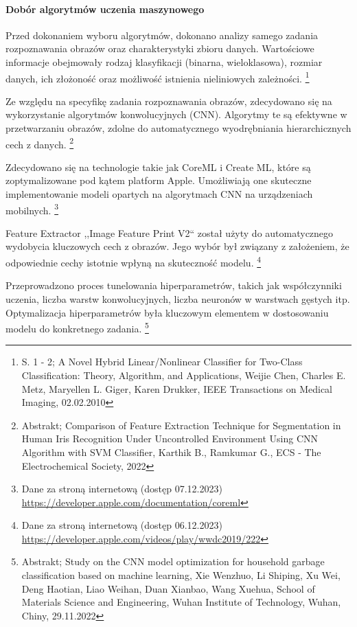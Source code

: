 \documentclass[12pt, a4paper, twoside, openany]{book}
\newcommand{\forceindent}{\leavevmode{\parindent=1.3em\indent}}
\begin{document}
\paragraph{Dobór algorytmów uczenia maszynowego\\}
\forceindent Przed dokonaniem wyboru algorytmów, dokonano analizy samego zadania rozpoznawania obrazów oraz charakterystyki zbioru danych.
Wartościowe informacje obejmowały rodzaj klasyfikacji (binarna, wieloklasowa), rozmiar danych, ich złożoność oraz możliwość istnienia nieliniowych zależności. \footnote{ S. 1 - 2; A Novel Hybrid Linear/Nonlinear Classifier for Two-Class Classification: Theory, Algorithm, and Applications, Weijie Chen, Charles E. Metz, Maryellen L. Giger, Karen Drukker, IEEE Transactions on Medical Imaging, 02.02.2010}

Ze względu na specyfikę zadania rozpoznawania obrazów, zdecydowano się na wykorzystanie algorytmów konwolucyjnych (CNN).
Algorytmy te są efektywne w przetwarzaniu obrazów, zdolne do automatycznego wyodrębniania hierarchicznych cech z danych. \footnote{Abstrakt; Comparison of Feature Extraction Technique for Segmentation in Human Iris Recognition Under Uncontrolled Environment Using CNN Algorithm with SVM Classifier, Karthik B., Ramkumar G., ECS - The Electrochemical Society, 2022}

Zdecydowano się na technologie takie jak CoreML i Create ML, które są zoptymalizowane pod kątem platform Apple.
Umożliwiają one skuteczne implementowanie modeli opartych na algorytmach CNN na urządzeniach mobilnych. \footnote{ Dane za stroną internetową (dostęp 07.12.2023) \url{https://developer.apple.com/documentation/coreml} }

Feature Extractor ,,Image Feature Print V2`` został użyty do automatycznego wydobycia kluczowych cech z obrazów.
Jego wybór był związany z założeniem, że odpowiednie cechy istotnie wpłyną na skuteczność modelu. \footnote{Dane za stroną internetową (dostęp 06.12.2023) \url{https://developer.apple.com/videos/play/wwdc2019/222}}

Przeprowadzono proces tunelowania hiperparametrów, takich jak współczynniki uczenia, liczba warstw konwolucyjnych, liczba neuronów w warstwach gęstych itp.
Optymalizacja hiperparametrów była kluczowym elementem w dostosowaniu modelu do konkretnego zadania. \footnote{Abstrakt; Study on the CNN model optimization for household garbage classification based on machine learning, Xie Wenzhuo, Li Shiping, Xu Wei, Deng Haotian, Liao Weihan, Duan Xianbao, Wang Xuehua, School of Materials Science and Engineering, Wuhan Institute of Technology, Wuhan, Chiny, 29.11.2022 }
\end{document}

